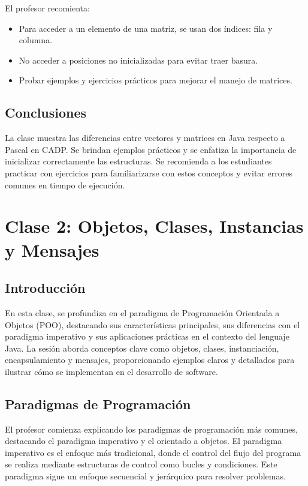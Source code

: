 \documentclass[a4paper]{report}
\begin{document}
El profesor recomienta:
\begin{itemize}
    \item Para acceder a un elemento de una matriz, se usan dos índices: fila y columna.

    \item No acceder a posiciones no inicializadas para evitar traer basura.

    \item Probar ejemplos y ejercicios prácticos para mejorar el manejo de matrices.
\end{itemize}


\section{Conclusiones}
La clase muestra las diferencias entre vectores y matrices en Java respecto a Pascal en CADP. Se brindan ejemplos prácticos y se enfatiza la importancia de inicializar correctamente las estructuras. Se recomienda a los estudiantes practicar con ejercicios para familiarizarse con estos conceptos y evitar errores comunes en tiempo de ejecución.

\newpage
\maketitle

\chapter{Clase 2: Objetos, Clases, Instancias y Mensajes}
\section{Introducción}
En esta clase, se profundiza en el paradigma de Programación Orientada a Objetos (POO), destacando sus características principales, sus diferencias con el paradigma imperativo y sus aplicaciones prácticas en el contexto del lenguaje Java. La sesión aborda conceptos clave como objetos, clases, instanciación, encapsulamiento y mensajes, proporcionando ejemplos claros y detallados para ilustrar cómo se implementan en el desarrollo de software.

\section{Paradigmas de Programación}
El profesor comienza explicando los paradigmas de programación más comunes, destacando el paradigma imperativo y el orientado a objetos. El paradigma imperativo es el enfoque más tradicional, donde el control del flujo del programa se realiza mediante estructuras de control como bucles y condiciones. Este paradigma sigue un enfoque secuencial y jerárquico para resolver problemas.
\end{document}
